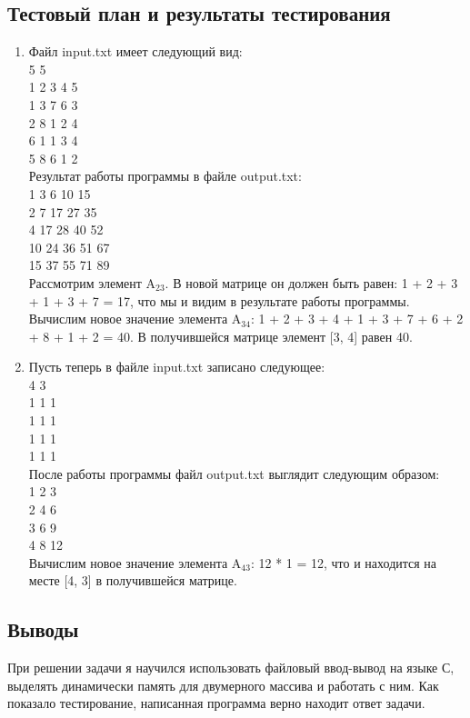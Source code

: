 \documentclass[12pt,a4paper]{report}
\begin{document}
\subsection{Тестовый план и результаты тестирования}
\begin{enumerate}
\item Файл input.txt имеет следующий вид: \\
5 5 \\
1 2 3 4 5 \\
1 3 7 6 3 \\
2 8 1 2 4 \\
6 1 1 3 4 \\
5 8 6 1 2 \\
Результат работы программы в файле output.txt:\\
1 3 6 10 15 \\
2 7 17 27 35 \\
4 17 28 40 52 \\
10 24 36 51 67 \\
15 37 55 71 89 \\
Рассмотрим элемент A$_{2 3}$. В новой матрице он должен быть равен: 1 + 2 + 3 + 1 + 3 + 7 = 17, что мы и видим в результате работы программы. Вычислим новое значение элемента A$_{3 4}$: 1 + 2 + 3 + 4 + 1 + 3 + 7 + 6 + 2 + 8 + 1 + 2 = 40. В получившейся матрице элемент [3, 4] равен 40. 
\item Пусть теперь в файле input.txt записано следующее: \\
4 3 \\
1 1 1 \\
1 1 1 \\
1 1 1 \\
1 1 1 \\
После работы программы файл output.txt выглядит следующим образом: \\
1 2 3 \\
2 4 6 \\
3 6 9 \\
4 8 12 \\
Вычислим новое значение элемента A$_{4 3}$: 12 * 1 = 12, что и находится на месте [4, 3] в получившейся матрице. 
\end{enumerate}
\subsection{Выводы}
При решении задачи я научился использовать файловый ввод-вывод на языке С, выделять динамически память для двумерного массива и работать с ним. Как показало тестирование, написанная программа верно находит ответ задачи. \\
\newpage
\end{document}
